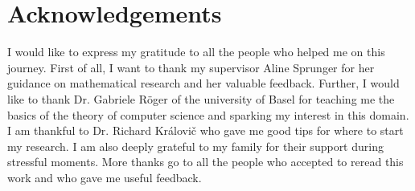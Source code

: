 \chapter*{Acknowledgements}

I would like to express my gratitude to all the people who helped me on this journey.
First of all, I want to thank my supervisor Aline Sprunger for her guidance on mathematical research and her valuable feedback.
Further, I would like to thank Dr. Gabriele Röger of the university of Basel for teaching me the basics of the theory of computer science and sparking my interest in this domain.
I am thankful to Dr. Richard Královi\v{c} who gave me good tips for where to start my research.
I am also deeply grateful to my family for their support during stressful moments.
More thanks go to all the people who accepted to reread this work and who gave me useful feedback. %
